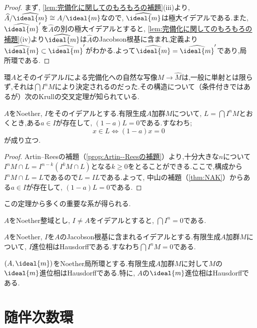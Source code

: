 \begin{proof}
	まず, \ref{lem:完備化に関してのもろもろの補題}(iii)より, $\widehat{A}/\widehat{\ideal{m}}\cong A/\ideal{m}$なので, $\widehat{\ideal{m}}$は極大イデアルである.また, $\widehat{\ideal{m}}'$を$\widehat{A}$の別の極大イデアルとすると, \ref{lem:完備化に関してのもろもろの補題}(iv)より$\widehat{\ideal{m}}$は$\widehat{A}$のJacobson根基に含まれ,定義より$\widehat{\ideal{m}}\subset\widehat{\ideal{m}}'$がわかる.よって$\widehat{\ideal{m}}=\widehat{\ideal{m}}'$であり,局所環である.
\end{proof}

環$A$とそのイデアル$I$による完備化への自然な写像$M\to\widehat{M}$は,一般に単射とは限らず,それは$\bigcap I^nM$により決定されるのだった.その構造について（条件付きではあるが）次のKrullの交叉定理が知られている.

\begin{thm}[Krullの交叉定理]
	$A$をNoether, $I$をそのイデアルとする.有限生成$A$加群$M$について, $L=\bigcap I^nM$とおくとき,ある$a\in I$が存在して, $(1-a)L=0$である.すなわち;
	\[x\in L\Longleftrightarrow (1-a)x=0\]
	が成り立つ.
\end{thm}

\begin{proof}
	Artin--Reesの補題（\ref{prop:Artin--Reesの補題}）より,十分大きな$n$について$I^n M\cap L=I^{n-k}(I^kM\cap L)$となる$k\geq0$をとることができる.ここで,構成から$I^n M\cap L=L$であるので$L=IL$である.よって, 中山の補題（\ref{thm:NAK}）からある$a\in I$が存在して, $(1-a)L=0$である.
\end{proof}

この定理から多くの重要な系が得られる.

\begin{cor}
	$A$をNoether整域とし, $I\neq A$をイデアルとすると, $\bigcap I^n=0$である.
\end{cor}

\begin{cor}\label{cor:Krullの交叉定理の系}
	$A$をNoether, $I$を$A$のJacobson根基に含まれるイデアルとする.有限生成$A$加群$M$について, $I$進位相はHausdorffである.すなわち$\bigcap I^nM=0$である.
\end{cor}

\begin{cor}
	$(A,\ideal{m})$をNoether局所環とする.有限生成$A$加群$M$に対して$M$の$\ideal{m}$進位相はHausdorffである.特に, $A$の$\ideal{m}$進位相はHausdorffである.
\end{cor}
\section{随伴次数環}

